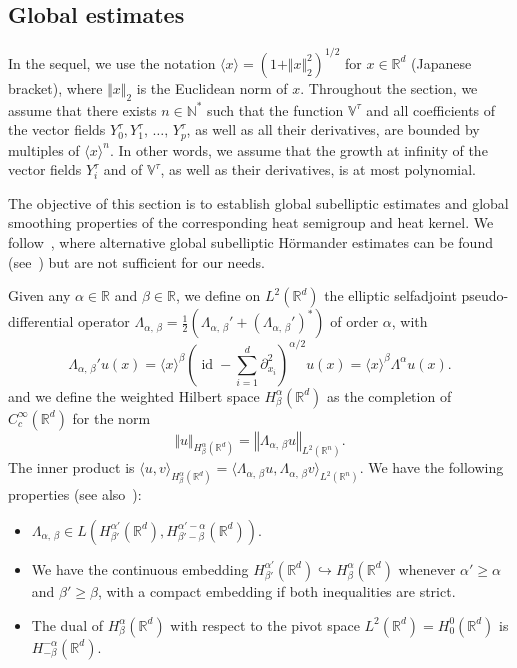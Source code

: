 \documentclass[10pt]{amsart}
\theoremstyle{definition}\newtheorem{defi}[theo]{Definition}\newtheorem{rema}[theo]{Remark}\newtheorem{exam}[theo]{Example}\newtheorem{exem}[theo]{Example}\newtheorem{nota}[theo]{Notation}
\newcommand*\R{\mathbb{R}}
\newcommand*\N{\mathbb{N}}
\newcommand{\bbV}{\mathbb{V}}
\DeclareMathOperator{\id}{id}
\renewcommand{\geq}{\geqslant}
\begin{document}
\subsection{Global estimates}\label{sec:global_estimates}
In the sequel, we use the notation $\langle x\rangle = (1+\Vert x\Vert_2^2)^{1/2}$ for $x\in\R^d$ (Japanese bracket), where $\Vert x\Vert_2$ is the Euclidean norm of $x$. Throughout the section, we assume that there exists $n\in\N^*$ such that the function $\bbV^\tau$ and all coefficients of the vector fields $Y_0^\tau,Y_1^\tau,\,\ldots,\,Y_p^\tau$, as well as all their derivatives, are bounded by multiples of $\langle x\rangle^n$. In other words, we assume that the growth at infinity of the vector fields $Y_i^\tau$ and of $\bbV^\tau$, as well as their derivatives, is at most polynomial.

The objective of this section is to establish global subelliptic estimates and global smoothing properties of the corresponding heat semigroup and heat kernel. We follow~\cite{EckmannHairer}, where alternative global subelliptic H\"ormander estimates can be found (see~\cite[Theorems~3.1 and 4.1]{EckmannHairer}) but are not sufficient for our needs.

Given any $\alpha\in\R$ and $\beta\in\R$, we define on $L^2(\R^d)$ the elliptic selfadjoint pseudo-differential operator $\Lambda_{\alpha,\,\beta}=\frac{1}{2}(\Lambda_{\alpha,\,\beta}'+(\Lambda_{\alpha,\,\beta}')^*)$ of order $\alpha$, with
\begin{equation*}
\Lambda_{\alpha,\,\beta}' u(x) = \langle x\rangle^\beta \left(\id-\sum_{i=1}^d\partial_{x_i}^2 \right)^{\alpha/2} u(x) = \langle x\rangle^\beta \Lambda^\alpha u(x).
\end{equation*}
and we define the weighted Hilbert space $H^\alpha_\beta(\R^d)$ as the completion of $C_c^\infty(\R^d)$ for the norm
\[
\Vert u\Vert_{H^\alpha_\beta\left(\R^d\right)} = \left\Vert \Lambda_{\alpha,\,\beta} u\right\Vert_{L^2\left(\R^n\right)}.
\]
The inner product is $\langle u,v\rangle_{H^\alpha_\beta(\R^d)} = \langle \Lambda_{\alpha,\,\beta}u,\Lambda_{\alpha,\,\beta}v\rangle_{L^2(\R^n)} $. We have the following properties (see also~\cite{EckmannHairer}):
\begin{itemize}
\item $\Lambda_{\alpha,\,\beta} \in L(H^{\alpha'}_{\beta'}(\R^d), H^{\alpha'-\alpha}_{\beta'-\beta}(\R^d))$.
\item We have the continuous embedding $H^{\alpha'}_{\beta'}(\R^d) \hookrightarrow H^{\alpha}_{\beta}(\R^d)$ whenever $\alpha'\geq\alpha$ and $\beta'\geq\beta$, with a compact embedding if both inequalities are strict.
\item The dual of $H^{\alpha}_{\beta}(\R^d)$ with respect to the pivot space $L^2(\R^d)=H^0_0(\R^d)$ is $H^{-\alpha}_{-\beta}(\R^d)$.
\end{itemize}
\end{document}
